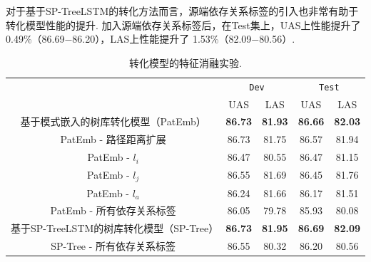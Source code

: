 对于基于SP-TreeLSTM的转化方法而言，源端依存关系标签的引入也非常有助于转化模型性能的提升. 加入源端依存关系标签后，在Test集上，UAS上性能提升了0.49\%（86.69−86.20），LAS上性能提升了 1.53\%（82.09−80.56）.
\begin{table}[hb!]
    \centering
    \caption{转化模型的特征消融实验. }
    \label{tb:feature-ablation-conversion}

    \begin{tabular}{c  cc  cc}
        \toprule
        \multirow{2}{*}{}
                                                 & \multicolumn{2}{c}{ \texttt{Dev}  }
                                                 & \multicolumn{2}{c}{ \texttt{Test} }                                                    \\
        \cline{2-5}
                                                 & UAS                                 & LAS            & UAS            & LAS            \\
        \midrule
        基于模式嵌入的树库转化模型（PatEmb）     & \textbf{86.73}                      & \textbf{81.93} & \textbf{86.66} & \textbf{82.03} \\
        PatEmb - 路径距离扩展                    & 86.73                               & 81.75          & 86.57          & 81.94          \\
        PatEmb -  $l_i$                          & 86.47                               & 80.55          & 86.47          & 81.15          \\
        PatEmb - $l_j$                           & 86.55                               & 81.69          & 86.45          & 81.76          \\
        PatEmb - $l_a$                           & {86.24}                             & 81.66          & {86.17}        & 81.51          \\
        PatEmb - 所有依存关系标签                & 86.05                               & 79.78          & 85.93          & 80.08          \\
        \midrule
        基于SP-TreeLSTM的树库转化模型（SP-Tree） & \textbf{86.73}                      & \textbf{81.95} & \textbf{86.69} & \textbf{82.09} \\
        SP-Tree - 所有依存关系标签               & 86.55                               & 80.32          & 86.20          & 80.56          \\
        \bottomrule
    \end{tabular}

\end{table}


